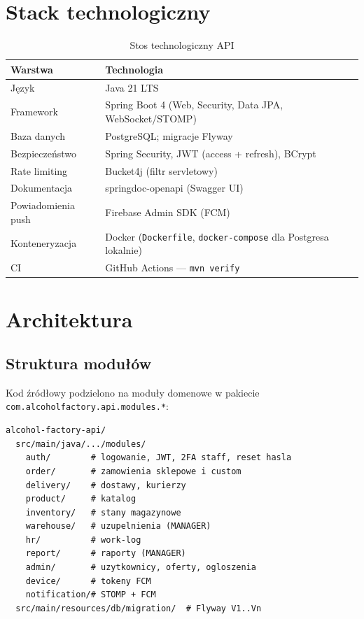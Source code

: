 \documentclass[12pt,a4paper]{report}
\newcommand{\blok}[1]{\needspace{9\baselineskip}#1}
\newcommand{\tabela}[1]{\needspace{11\baselineskip}#1}
\begin{document}
\chapter{Stack technologiczny}

\tabela{%
\begin{table}[H]
  \centering
  \caption{Stos technologiczny API}
  \label{tab:stack}
  \begin{tabularx}{\textwidth}{@{}lX@{}}
    \toprule
    \textbf{Warstwa} & \textbf{Technologia} \\
    \midrule
    Język & Java 21 LTS \\
    Framework & Spring Boot 4 (Web, Security, Data JPA, WebSocket/STOMP) \\
    Baza danych & PostgreSQL; migracje Flyway \\
    Bezpieczeństwo & Spring Security, JWT (access + refresh), BCrypt \\
    Rate limiting & Bucket4j (filtr servletowy) \\
    Dokumentacja & springdoc-openapi (Swagger UI) \\
    Powiadomienia push & Firebase Admin SDK (FCM) \\
    Konteneryzacja & Docker (\texttt{Dockerfile}, \texttt{docker-compose} dla Postgresa lokalnie) \\
    CI & GitHub Actions --- \texttt{mvn verify} \\
    \bottomrule
  \end{tabularx}
\end{table}
}

\chapter{Architektura}

\section{Struktura modułów}

\blok{%
Kod źródłowy podzielono na moduły domenowe w pakiecie \texttt{com.alcoholfactory.api.modules.*}:
}

\begin{lstlisting}[style=tree]
alcohol-factory-api/
  src/main/java/.../modules/
    auth/        # logowanie, JWT, 2FA staff, reset hasla
    order/       # zamowienia sklepowe i custom
    delivery/    # dostawy, kurierzy
    product/     # katalog
    inventory/   # stany magazynowe
    warehouse/   # uzupelnienia (MANAGER)
    hr/          # work-log
    report/      # raporty (MANAGER)
    admin/       # uzytkownicy, oferty, ogloszenia
    device/      # tokeny FCM
    notification/# STOMP + FCM
  src/main/resources/db/migration/  # Flyway V1..Vn
\end{lstlisting}
\end{document}
